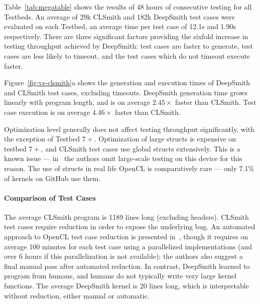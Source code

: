 Table~\ref{tab:megatable} shows the results of 48 hours of consecutive testing for all Testbeds. An average of 29k CLSmith and 182k DeepSmith test cases were evaluated on each Testbed, an average time per test case of 12.1s and 1.90s respectively. There are three significant factors providing the sixfold increase in testing throughput achieved by DeepSmith: test cases are faster to generate, test cases are less likely to timeout, and the test cases which do not timeout execute faster.

Figure~\ref{fig:vs-clsmith}a shows the generation and execution times of DeepSmith and CLSmith test cases, excluding timeouts. DeepSmith generation time grows linearly with program length, and is on average $2.45\times$ faster than CLSmith. Test case execution is on average $4.46\times$ faster than CLSmith.

Optimization level generally does not affect testing throughput significantly, with the exception of Testbed $7+$. Optimization of large structs is expensive on testbed $7+$, and CLSmith test cases use global structs extensively. This is a known issue --- in~\cite{Lidbury2015a} the authors omit large-scale testing on this device for this reason. The use of structs in real life OpenCL is comparatively rare --- only 7.1\% of kernels on GitHub use them.



\paragraph{Comparison of Test Cases} %
The average CLSmith program is 1189 lines long (excluding headers). CLSmith test cases require reduction in order to expose the underlying bug. An automated approach to OpenCL test case reduction is presented in~\cite{Pflanzer2016}, though it requires on average 100 minutes for each test case using a parallelized implementations (and over 6 hours if this parallelization is not available); the authors also suggest a final manual pass after automated reduction. In contrast, DeepSmith learned to program from humans, and humans do not typically write very large kernel functions. The average DeepSmith kernel is 20 lines long, which is interpretable without reduction, either manual or automatic. \cc{}



